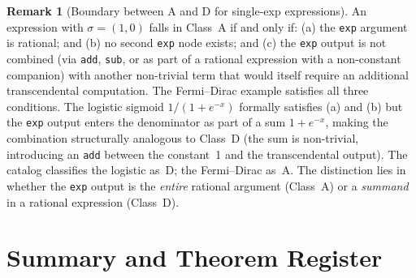 \documentclass[12pt,a4paper]{article}
\theoremstyle{definition}
\newtheorem{remark}[theorem]{Remark}
\begin{document}
\begin{remark}[Boundary between A and D for single-exp expressions]
\label{rem:AD-boundary}
An expression with $\sigma = (1,0)$ falls in Class~A if and only if:
(a) the \texttt{exp} argument is rational; and
(b) no second \texttt{exp} node exists; and
(c) the \texttt{exp} output is not combined (via \texttt{add},
\texttt{sub}, or as part of a rational expression with a non-constant
companion) with another non-trivial term that would itself require an
additional transcendental computation.
The Fermi--Dirac example satisfies all three conditions.
The logistic sigmoid $1/(1 + e^{-x})$ formally satisfies (a) and (b)
but the \texttt{exp} output enters the denominator as part of a sum
$1 + e^{-x}$, making the combination structurally analogous to
Class~D (the sum is non-trivial, introducing an \texttt{add} between
the constant~1 and the transcendental output).
The catalog classifies the logistic as~D; the Fermi--Dirac as~A.
The distinction lies in whether the \texttt{exp} output is the
\emph{entire} rational argument (Class~A) or a \emph{summand} in a
rational expression (Class~D).
\end{remark}

\section{Summary and Theorem Register}
\label{sec:summary}
\end{document}
